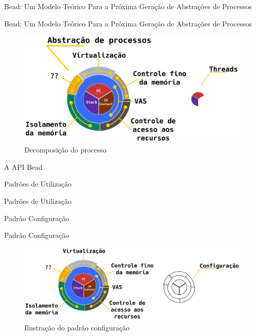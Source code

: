 \documentclass[xcolor={usenames,svgnames,dvipsnames},brazil,english,12pt,aspectratio=149]{beamer}
\begin{document}
\begin{frame}{Bead: Um Modelo Teórico Para a Próxima Geração de Abstrações de Processos}
  
\end{frame}

\begin{frame}{Bead: Um Modelo Teórico Para a Próxima Geração de Abstrações de Processos}
  \begin{figure}[!h]
    \centering
    \includegraphics[width=\textwidth]{decomposicao_overview}
    \caption{Decomposição do processo}
    \label{fig:decomposicao_proc}
  \end{figure}
\end{frame}

\begin{frame}{A API Bead}
\end{frame}

\begin{frame}{Padrões de Utilização}
\end{frame}

\begin{frame}{Padrões de Utilização}
\end{frame}

\begin{frame}{Padrão Configuração}
\end{frame}

\begin{frame}{Padrão Configuração}
  \begin{figure}[!h]
    \centering
    \includegraphics[width=\textwidth]{decomposition_conf}
    \caption{Ilustração do padrão configuração}
    \label{fig:decomposicao_conf}
  \end{figure}
\end{frame}
\end{document}
